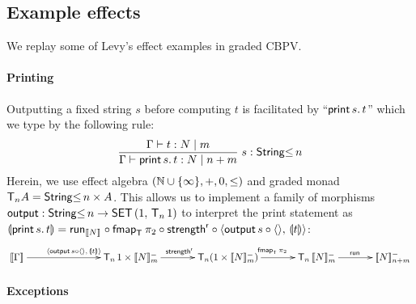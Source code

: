\documentclass[acmsmall,review,anonymous]{acmart}\settopmatter{printfolios=true,printccs=false,printacmref=false}
\theoremstyle{remark}
\begin{document}
\subsection{Example effects}

We replay some of Levy's \citeyearpar{levy:hosc06} effect examples in
graded CBPV.

\paragraph{Printing}

Outputting a fixed string $s$ before computing $t$ is
facilitated by ``$\print s t$'' which we type by the following rule:
\[
  \rux{\CompTy \Gamma t m N
     }{\CompTy \Gamma {\print s t} {n + m} N
     }{s : \StringLe n}
\]
Herein, we use effect algebra $(\bN \cup \{\infty\},+,0,\leq)$ and
graded monad $\T[n]A = \StringLe n \times A$.
%
This allows us to implement a family of morphisms
$\toutput : \StringLe n \to \Hom[\SET] {1} {\T[n]\,1}$ to interpret
the print statement as
$\dent {\print s t} = \run[\den N] \comp \fmap[\T]{\pi_2} \comp
\strengthr \comp \langle \toutput\,s \comp \langle\rangle,\, \dent t
\rangle$:
\[
\xymatrix@C=8ex{
  \den \Gamma
     \ar[rr]^{\langle \toutput\,s \comp \langle\rangle,\, \dent t \rangle}
&& \T[n]\,1 \times \Denn N m
     \ar[r]^{\strengthr}
& \T[n](1 \times \Denn N m)
     \ar[r]^{\fmap[\T]{\pi_2}}
& \T[n]\,\Denn N m
     \ar[r]^{\trun}
& \Denn N {n + m}
}
\]


\paragraph{Exceptions}
\end{document}
